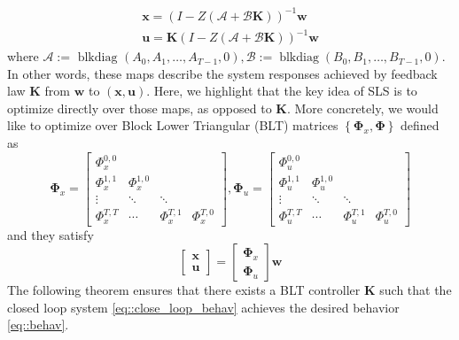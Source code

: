 \documentclass{article}[12pt]
\begin{document}
\begin{equation}
\label{eq::close_loop_behav}
    \begin{array}{l}{\mathbf{x}=(I-Z(\mathcal{A}+\mathcal{B}\mathbf{K}))^{-1} \mathbf{w}} \\ {\mathbf{u}=\mathbf{K}(I-Z(\mathcal{A}+\mathcal{B}\mathbf{K}))^{-1} \mathbf{w}}\end{array}
\end{equation}
where $\mathcal{A}:=\text { blkdiag }\left(A_{0}, A_{1}, \ldots, A_{T-1}, 0\right), \mathcal{B}:=\operatorname{blkdiag}\left(B_{0}, B_{1}, \ldots, B_{T-1}, 0\right)$.
In other words, these maps describe the system responses achieved by feedback law $\mathbf{K}$
from $\mathbf{w}$ to $(\mathbf{x},\mathbf{u})$.
Here, we highlight that the key idea of SLS is to optimize directly over those maps, as opposed to $\mathbf{K}$. More concretely, we would like to optimize over Block Lower Triangular (BLT) matrices $\left\{\mathbf{\Phi}_{x}, \mathbf{\Phi}\right\}$ defined as
\begin{equation}
    \mathbf{\Phi}_{x}=\left[\begin{array}{cccc}{\Phi_{x}^{0,0}} & {} & {} & {} \\ {\Phi_{x}^{1,1}} & {\Phi_{x}^{1,0}} & {} & {} \\ {\vdots} & {\ddots} & {\ddots} & {} \\ {\Phi_{x}^{T, T}} & {\cdots} & {\Phi_{x}^{T, 1}} & {\Phi_{x}^{T, 0}}\end{array}\right], \mathbf{\Phi}_{u}=\left[\begin{array}{cccc}{\Phi_{u}^{0,0}} & {} & {} & {} \\ {\Phi_{u}^{1,1}} & {\Phi_{u}^{1,0}} & {} & {} \\ {\vdots} & {\ddots} & {\ddots} & {} \\ {\Phi_{u}^{T, T}} & {\cdots} & {\Phi_{u}^{T, 1}} & {\Phi_{u}^{T, 0}}\end{array}\right]
\end{equation}
and they satisfy
\begin{equation}
\label{eq::behav}
    \left[\begin{array}{l}{\mathbf{x}} \\ {\mathbf{u}}\end{array}\right]=\left[\begin{array}{l}{\mathbf{\Phi}_{x}} \\ {\mathbf{\Phi}_{u}}\end{array}\right] \mathbf{w}
\end{equation}
The following theorem ensures that there exists a BLT controller $\mathbf{K}$ such that the closed loop system \eqref{eq::close_loop_behav} achieves the desired behavior \eqref{eq::behav}.
\end{document}
